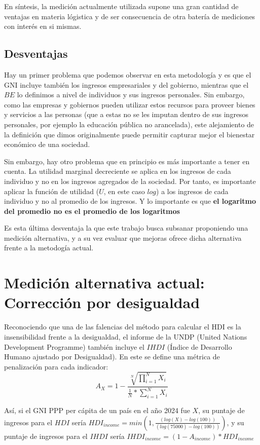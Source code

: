 En síntesis, la medición actualmente utilizada supone una gran cantidad de ventajas en materia lógistica y de ser consecuencia de otra batería de mediciones con interés en si mismas.

\subsection{Desventajas}

Hay un primer problema que podemos observar en esta metodología y es que el GNI incluye también los ingresos empresariales y del gobierno, mientras que el $BE$ lo definimos a nivel de individuos y sus ingresos personales. Sin embargo, como las empresas y gobiernos pueden utilizar estos recursos para proveer bienes y servicios a las personas (que a estas no se les imputan dentro de sus ingresos personales, por ejemplo la educación pública no arancelada), este alejamiento de la definición que dimos originalmente puede permitir capturar mejor el bienestar económico de una sociedad. 

Sin embargo, hay otro problema que en principio es más importante a tener en cuenta. La utilidad marginal decreciente se aplica en los ingresos de cada individuo y no en los ingresos agregados de la sociedad. Por tanto, es importante aplicar la función de utilidad ($U$, en este caso $log$) a los ingresos de cada individuo y no al promedio de los ingresos. Y lo importante es que \textbf{el logaritmo del promedio no es el promedio de los logaritmos}

Es esta última desventaja la que este trabajo busca subsanar proponiendo una medición alternativa, y a su vez evaluar que mejoras ofrece dicha alternativa frente a la metodogía actual.

\section{Medición alternativa actual: Corrección por desigualdad}

Reconociendo que una de las falencias del método para calcular el HDI es la insensibilidad frente a la desigualdad, el informe de la UNDP (United Nations Development Programme) también incluye el $IHDI$ (Índice de Desarrollo Humano ajustado por Desigualdad). En este se define una métrica de penalización para cada indicador:
$$
    A_X = 1 - \frac{\sqrt[N]{\prod_{i=1}^NX_i}}{\frac{1}{N} * \sum_{i=1}^N X_i}
$$

Así, si el GNI PPP per cápita de un país en el año 2024 fue $X$, su puntaje de ingresos para el $HDI$ sería $ HDI_{income} = min(1, \frac{(log(X)-log(100))}{(log(75000)-log(100))})$, y su puntaje de ingresos para el $IHDI$ sería $IHDI_{income} = (1-A_{income}) * HDI_{income}$

